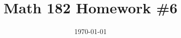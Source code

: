 \documentclass{article}
\date{\today}
\title{Math 182 Homework \#6}
\begin{document}
\maketitle

\begin{prob}
\end{prob}


\end{document}
